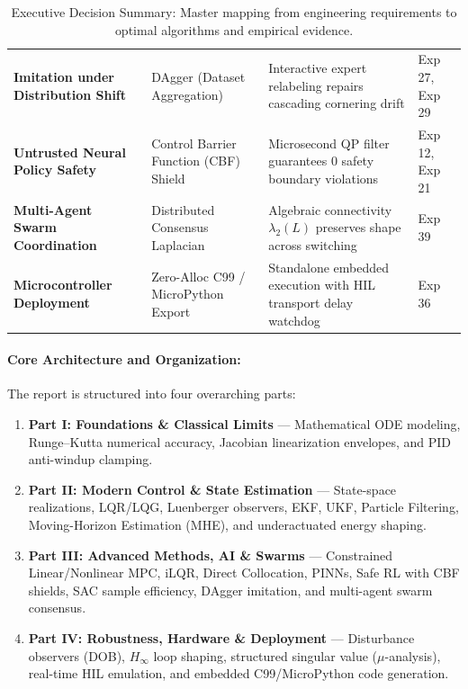 \documentclass[11pt,a4paper]{article}
\begin{document}
\begin{table}[H]
{\begin{tabular}{@{}llll@{}}
\textbf{Imitation under Distribution Shift} & DAgger (Dataset Aggregation) & Interactive expert relabeling repairs cascading cornering drift & Exp 27, Exp 29 \\
\textbf{Untrusted Neural Policy Safety} & Control Barrier Function (CBF) Shield & Microsecond QP filter guarantees $0$ safety boundary violations & Exp 12, Exp 21 \\
\textbf{Multi-Agent Swarm Coordination} & Distributed Consensus Laplacian & Algebraic connectivity $\lambda_2(L)$ preserves shape across switching & Exp 39 \\
\textbf{Microcontroller Deployment} & Zero-Alloc C99 / MicroPython Export & Standalone embedded execution with HIL transport delay watchdog & Exp 36 \\
\bottomrule
\end{tabular}%
}
\caption{Executive Decision Summary: Master mapping from engineering requirements to optimal algorithms and empirical evidence.}
\label{tab:exec_summary}
\end{table}

\paragraph{Core Architecture and Organization:}
The report is structured into four overarching parts:
\begin{enumerate}[nosep]
  \item \textbf{Part I: Foundations \& Classical Limits} --- Mathematical ODE modeling, Runge--Kutta numerical accuracy, Jacobian linearization envelopes, and PID anti-windup clamping.
  \item \textbf{Part II: Modern Control \& State Estimation} --- State-space realizations, LQR/LQG, Luenberger observers, EKF, UKF, Particle Filtering, Moving-Horizon Estimation (MHE), and underactuated energy shaping.
  \item \textbf{Part III: Advanced Methods, AI \& Swarms} --- Constrained Linear/Nonlinear MPC, iLQR, Direct Collocation, PINNs, Safe RL with CBF shields, SAC sample efficiency, DAgger imitation, and multi-agent swarm consensus.
  \item \textbf{Part IV: Robustness, Hardware \& Deployment} --- Disturbance observers (DOB), $H_\infty$ loop shaping, structured singular value ($\mu$-analysis), real-time HIL emulation, and embedded C99/MicroPython code generation.
\end{enumerate}

\newpage
\end{document}
